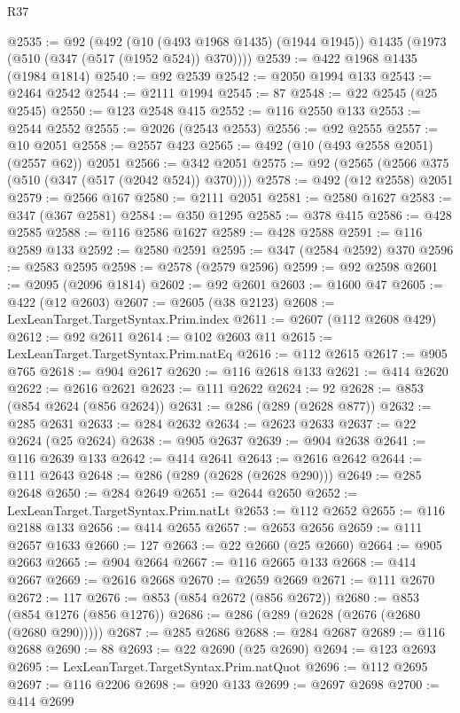 \begin{lexlean}{R37}
\begin{coremodule}
@2535 := @92
    (@492
      (@10 (@493 @1968 @1435) (@1944 @1945))
      @1435
      (@1973 (@510 (@347 (@517 (@1952 @524)) @370))))
@2539 := @422 @1968 @1435 (@1984 @1814)
@2540 := @92 @2539
@2542 := @2050 @1994 @133
@2543 := @2464 @2542
@2544 := @2111 @1994
@2545 := 87
@2548 := @22 @2545 (@25 @2545)
@2550 := @123 @2548 @415
@2552 := @116 @2550 @133
@2553 := @2544 @2552
@2555 := @2026 (@2543 @2553)
@2556 := @92 @2555
@2557 := @10 @2051
@2558 := @2557 @423
@2565 := @492 (@10 (@493 @2558 @2051) (@2557 @62)) @2051
@2566 := @342 @2051
@2575 := @92 (@2565 (@2566 @375 (@510 (@347 (@517 (@2042 @524)) @370))))
@2578 := @492 (@12 @2558) @2051
@2579 := @2566 @167
@2580 := @2111 @2051
@2581 := @2580 @1627
@2583 := @347 (@367 @2581)
@2584 := @350 @1295
@2585 := @378 @415
@2586 := @428 @2585
@2588 := @116 @2586 @1627
@2589 := @428 @2588
@2591 := @116 @2589 @133
@2592 := @2580 @2591
@2595 := @347 (@2584 @2592) @370
@2596 := @2583 @2595
@2598 := @2578 (@2579 @2596)
@2599 := @92 @2598
@2601 := @2095 (@2096 @1814)
@2602 := @92 @2601
@2603 := @1600 @47
@2605 := @422 (@12 @2603)
@2607 := @2605 (@38 @2123)
@2608 := LexLeanTarget.TargetSyntax.Prim.index
@2611 := @2607 (@112 @2608 @429)
@2612 := @92 @2611
@2614 := @102 @2603 @11
@2615 := LexLeanTarget.TargetSyntax.Prim.natEq
@2616 := @112 @2615
@2617 := @905 @765
@2618 := @904 @2617
@2620 := @116 @2618 @133
@2621 := @414 @2620
@2622 := @2616 @2621
@2623 := @111 @2622
@2624 := 92
@2628 := @853 (@854 @2624 (@856 @2624))
@2631 := @286 (@289 (@2628 @877))
@2632 := @285 @2631
@2633 := @284 @2632
@2634 := @2623 @2633
@2637 := @22 @2624 (@25 @2624)
@2638 := @905 @2637
@2639 := @904 @2638
@2641 := @116 @2639 @133
@2642 := @414 @2641
@2643 := @2616 @2642
@2644 := @111 @2643
@2648 := @286 (@289 (@2628 (@2628 @290)))
@2649 := @285 @2648
@2650 := @284 @2649
@2651 := @2644 @2650
@2652 := LexLeanTarget.TargetSyntax.Prim.natLt
@2653 := @112 @2652
@2655 := @116 @2188 @133
@2656 := @414 @2655
@2657 := @2653 @2656
@2659 := @111 @2657 @1633
@2660 := 127
@2663 := @22 @2660 (@25 @2660)
@2664 := @905 @2663
@2665 := @904 @2664
@2667 := @116 @2665 @133
@2668 := @414 @2667
@2669 := @2616 @2668
@2670 := @2659 @2669
@2671 := @111 @2670
@2672 := 117
@2676 := @853 (@854 @2672 (@856 @2672))
@2680 := @853 (@854 @1276 (@856 @1276))
@2686 := @286 (@289 (@2628 (@2676 (@2680 (@2680 @290)))))
@2687 := @285 @2686
@2688 := @284 @2687
@2689 := @116 @2688
@2690 := 88
@2693 := @22 @2690 (@25 @2690)
@2694 := @123 @2693
@2695 := LexLeanTarget.TargetSyntax.Prim.natQuot
@2696 := @112 @2695
@2697 := @116 @2206
@2698 := @920 @133
@2699 := @2697 @2698
@2700 := @414 @2699

\end{coremodule}
\end{lexlean}
